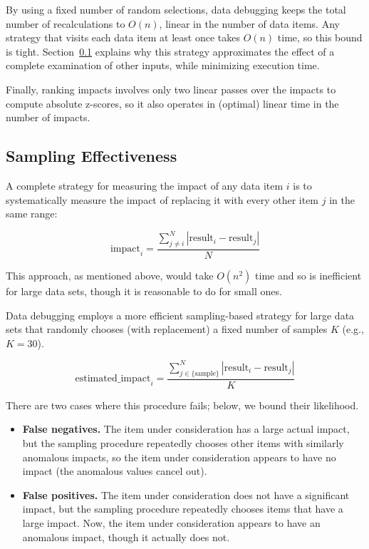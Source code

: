 By using a fixed number of random selections, data debugging keeps the
total number of recalculations to $O(n)$, linear in the number of
data items. Any strategy that visits each data item at least once takes $O(n)$ time, so this bound is tight. Section~\ref{sec:sampling_effectiveness}
explains why this strategy approximates the effect of a complete
examination of other inputs, while minimizing execution time.

Finally, ranking impacts involves only two linear passes over the
impacts to compute absolute z-scores, so it also operates in (optimal)
linear time in the number of impacts.

\subsection{Sampling Effectiveness}
\label{sec:sampling_effectiveness}

A complete strategy for measuring the impact of any data item $i$ is to
systematically measure the impact of replacing it with every other
item $j$ in the same range:

\begin{equation}
\mbox{impact}_i = \frac{\sum_{j \neq i}^{N}{|\mbox{result}_i-\mbox{result}_j|}}{N}
\end{equation}

\noindent
This approach, as mentioned above, would take $O(n^2)$ time and so is
inefficient for large data sets, though it is reasonable to do for
small ones.

Data debugging employs a more efficient sampling-based strategy for
large data sets that randomly chooses (with replacement) a fixed
number of samples $K$ (e.g., $K = 30$).

\begin{equation}
\mbox{estimated\_impact}_i = \frac{\sum_{j \in \{\mbox{sample}\}}^{N}{|\mbox{result}_i-\mbox{result}_j|}}{K}
\end{equation}

\noindent
There are two cases where this procedure fails; below, we bound their likelihood.

\begin{itemize}
\item \textbf{False negatives.} The item under consideration has a
  large actual impact, but the sampling procedure repeatedly
  chooses other items with similarly anomalous impacts, so the item under
  consideration appears to have no impact (the anomalous values cancel out).
\item \textbf{False positives.} The item under consideration does
  not have a significant impact, but the sampling procedure
  repeatedly chooses items that have a large impact. Now, the item
  under consideration appears to have an anomalous impact, though it actually does not.
\end{itemize}

